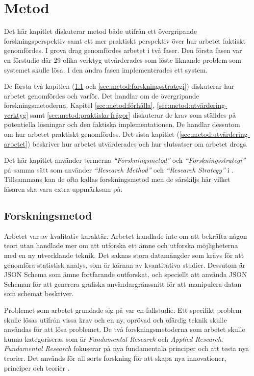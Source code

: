 \chapter{Metod}
\label{sec:metod}

Det här kapitlet diskuterar metod både utifrån ett övergripande forskningsperspektiv samt ett mer praktiskt perspektiv över hur arbetet faktiskt genomfördes. I grova drag genomfördes arbetet i två faser. Den första fasen var en förstudie där 29 olika verktyg utvärderades som löste liknande problem som systemet skulle lösa. I den andra fasen implementerades ett system.

De första två kapitlen (\ref{sec:metod:forskningsmetod} och \ref{sec:metod:forskningsstrategi}) diskuterar hur arbetet genomfördes och varför. Det handlar om de övergripande forskningsmetoderna. Kapitel \ref{sec:metod:förhålla}, \ref{sec:metod:utvärdering-verktyg} samt \ref{sec:metod:praktiska-frågor} diskuterar de krav som ställdes på potentiella lösningar och den faktiska implementationen. De handlar dessutom om hur arbetet praktiskt genomfördes. Det sista kapitlet (\ref{sec:metod:utvärdering-arbetet}) beskriver hur arbetet utvärderades och hur slutsatser om arbetet drogs.

Det här kapitlet använder termerna \textit{``Forskningsmetod''} och \textit{``Forskningsstrategi''} på samma sätt som \citeauthor{Hakansson} använder \textit{``Research Method''} och \textit{``Research Strategy''} i \textit{} \cite{Hakansson}. Tillsammans kan de ofta kallas forskningsmetod men de särskiljs här vilket läsaren ska vara extra uppmärksam på.

\section{Forskningsmetod}
\label{sec:metod:forskningsmetod}
Arbetet var av kvalitativ karaktär. Arbetet handlade inte om att bekräfta någon teori utan handlade mer om att utforska ett ämne och utforska möjligheterna med en ny utvecklande teknik. Det saknas stora datamängder som krävs för att genomföra statistisk analys, som är kärnan av kvantitativa studier. Dessutom är JSON Schema som ämne fortfarande outforskat, och speciellt att använda JSON Scheman för att generera grafiska användargränssnitt för att manipulera datan som schemat beskriver.

\newpage

Problemet som arbetet grundade sig på var en fallstudie. Ett specifikt problem skulle lösas utifrån vissa krav och en ny, oprövad och ofärdig teknik skulle användas för att lösa problemet. De två forskningsmetoderna som arbetet skulle kunna kategoriseras som är \textit{Fundamental Research} och \textit{Applied Research}. \textit{Fundamental Research} fokuserar på nya fundamentala principer och att testa nya teorier. Det används för all sorts forskning för att skapa nya innovationer, principer och teorier \cite{Hakansson}.

